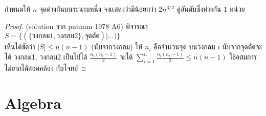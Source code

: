 \documentclass[a4paper,12pt]{scrartcl}
\begin{document}
	\begin{example}
		กำหนดให้ $n$ จุดต่างกันบนระนาบหนึ่ง จงเเสดงว่ามีน้อยกว่า $2n^{3/2}$ คู่อันดับซึ่งห่างกัน $1$ หน่วย
	\end{example}
\begin{proof}
	(solution จาก putnam 1978 A6) พิจารณา $S = \{ (\{ \text{วงกลม1},\text{วงกลม2} \}, \text{จุดตัด}) | \dots) \}$ \\
	เห็นได้ชัดว่า $|S| \le n(n-1)$ (นับจากวงกลม) ให้ $n_i$ คือจำนวนจุด บนวงกลม $i$ นับจากจุดตัดจะได้ {วงกลม1, วงกลม2} เป็นไปได้ $\frac{n_i(n_i-1)}{2}$ จะได้ $\sum_{i=1}^{n}\frac{n_i(n_i-1)}{2} \le n(n-1)$ ใช้อสมการไม่ยากได้สอดคล้อง กับโจทย์
\end{proof}

\section{Algebra}
\end{document}
